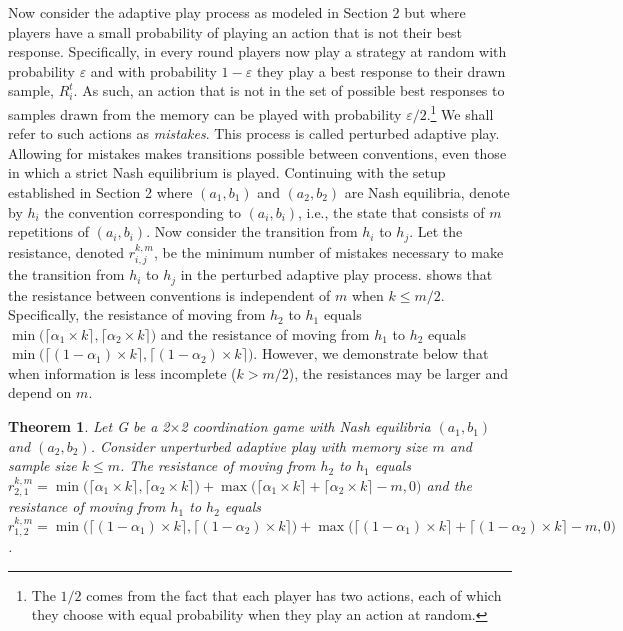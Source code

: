 \documentclass[11.5pt]{article}
\newtheorem{theorem}{Theorem}
\begin{document}
Now consider the adaptive play process as modeled in Section 2 but where players have a small probability of playing an action that is not their best response. Specifically, in every round players now play a strategy at random with probability $\varepsilon$ and with probability $1-\varepsilon$ they play a best response to their drawn sample, $R_i^{t}$. As such, an action that is not in the set of possible best responses to samples drawn from the memory can be played with probability $\varepsilon/2$.\footnote{The $1/2$ comes from the fact that each player has two actions, each of which they choose with equal probability when they
play an action at random.} We shall refer to such actions as \textit{mistakes}. This process is called perturbed adaptive play. Allowing for mistakes makes transitions possible between conventions, even those in which a strict Nash equilibrium is played. Continuing with the setup established in Section 2 where $(a_1, b_1)$ and $(a_2, b_2)$ are Nash equilibria, denote by $h_i$ the convention corresponding to $(a_i, b_i)$, i.e., the state that consists of $m$
repetitions of $(a_i, b_i)$.
Now consider the transition from $h_i$ to $h_j$. Let the resistance, denoted $r_{i,j}^{k,m}$, be the minimum number of mistakes necessary to make the transition from $h_i$ to $h_j$ in the perturbed adaptive play process.
\cite{Young1998} shows that the resistance between conventions is independent of $m$ when $k \leq m/2$. Specifically, the resistance of moving from $h_2$ to $h_1$ equals $\min\big(\lceil \alpha_1 \times k \rceil,\lceil \alpha_2 \times k \rceil\big)$ and the resistance of moving from $h_1$ to $h_2$ equals $\min\big(\lceil (1-\alpha_1) \times k \rceil,\lceil (1-\alpha_2) \times  k \rceil\big)$. However, we demonstrate below that when information is less incomplete ($k > m/2$), the resistances may be larger and depend on $m$.


\begin{theorem}\label{Theorem_3}
Let G be a 2$\times$2 coordination game with Nash equilibria $(a_1,b_1)$ and $(a_2,b_2)$. 
Consider unperturbed adaptive play with memory size $m$ and sample size $k\leq m$. 
The resistance of moving from $h_2$ to $h_1$ equals $r_{2,1}^{k,m} = \min\big(\lceil \alpha_1 \times k \rceil,\lceil \alpha_2 \times k \rceil\big)+\max\big(\lceil\alpha_1\times k\rceil+\lceil \alpha_2 \times k \rceil-m,0\big)$ and the resistance of moving from $h_1$ to $h_2$ equals $r^{k,m}_{1,2}=\min\big(\lceil (1-\alpha_1) \times k \rceil, \lceil (1-\alpha_2) \times  k \rceil\big)+\max\big(\lceil (1-\alpha_1) \times k \rceil+\lceil (1-\alpha_2) \times k \rceil-m,0\big)$. 
\end{theorem}
\end{document}
